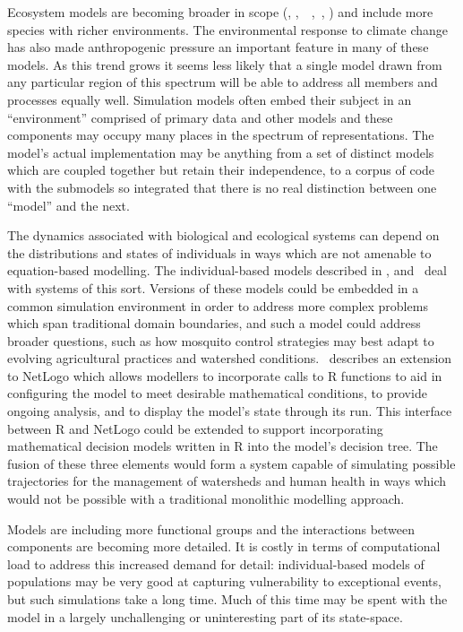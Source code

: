 Ecosystem models are becoming broader in scope (\citet{Rose10:1},
\citet{DeAngelis98:1},~\citet{Harvey03:1}~\citet{Fulton04:1},~\citet{gray2006nws},
\citet{Ningaloo:1}) and include more species with richer environments. The
environmental response to climate change has also made anthropogenic pressure
an important feature in many of these models. As this trend grows it seems
less likely that a single model drawn from any particular region of this
spectrum will be able to address all members and processes equally well.
Simulation models often embed their subject in an ``environment'' comprised of
primary data and other models and these components may occupy many places in
the spectrum of representations. The model's actual implementation may be
anything from a set of distinct models which are coupled together but retain
their independence, to a corpus of code with the submodels so integrated that
there is no real distinction between one ``model'' and the next.

The dynamics associated with biological and ecological systems can depend on
the distributions and states of individuals in ways which are not amenable to
equation-based modelling. The individual-based models described in
\citet{Farolfi2010}, and~\citet{Almeida2010} deal with systems of this sort.
Versions of these models could be embedded in a common simulation environment
in order to address more complex problems which span traditional domain
boundaries, and such a model could address broader questions, such as how
mosquito control strategies may best adapt to evolving agricultural practices
and watershed conditions.~\citet{Thiele2010} describes an extension to NetLogo
which allows modellers to incorporate calls to R functions to aid in
configuring the model to meet desirable mathematical conditions, to provide
ongoing analysis, and to display the model's state through its run. This
interface between R and NetLogo could be extended to support incorporating
mathematical decision models written in R into the model's decision tree. The
fusion of these three elements would form a system capable of simulating
possible trajectories for the management of watersheds and human health in
ways which would not be possible with a traditional monolithic modelling
approach.

Models are including more functional groups and the interactions between
components are becoming more detailed. It is costly in terms of computational
load to address this increased demand for detail: individual-based models of
populations may be very good at capturing vulnerability to exceptional events,
but such simulations take a long time. Much of this time may be spent with the
model in a largely unchallenging or uninteresting part of its state-space.

